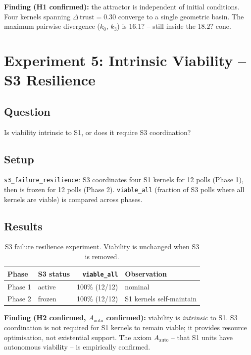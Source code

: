 \documentclass[11pt, a4paper]{article}
\begin{document}
\textbf{Finding (H1 confirmed):} the attractor is independent of initial
conditions.
Four kernels spanning $\Delta\,\text{trust} = 0.30$ converge to a single
geometric basin.
The maximum pairwise divergence ($k_0$, $k_3$) is $16.1?$ -- still inside
the $18.2?$ cone.


\section{Experiment 5: Intrinsic Viability -- S3 Resilience}
\label{sec:resilience}

\subsection*{Question} Is viability intrinsic to S1, or does it require
S3 coordination?

\subsection{Setup}

\texttt{s3\_failure\_resilience}: S3 coordinates four S1 kernels for 12 polls
(Phase 1), then is frozen for 12 polls (Phase 2).
\texttt{viable\_all} (fraction of S3 polls where all kernels are viable) is
compared across phases.

\subsection{Results}

\begin{table}[h]
\centering
\begin{tabular}{llrl}
\toprule
Phase & S3 status & \texttt{viable\_all} & Observation \\
\midrule
Phase 1 & active & 100\% (12/12) & nominal \\
Phase 2 & frozen & 100\% (12/12) & S1 kernels self-maintain \\
\bottomrule
\end{tabular}
\caption{S3 failure resilience experiment.
Viability is unchanged when S3 is removed.}
\label{tab:resilience}
\end{table}

\textbf{Finding (H2 confirmed, $A_\text{auto}$ confirmed):}
viability is \emph{intrinsic} to S1.
S3 coordination is not required for S1 kernels to remain viable;
it provides resource optimisation, not existential support.
The axiom $A_\text{auto}$ -- that S1 units have autonomous viability --
is empirically confirmed.
\end{document}
